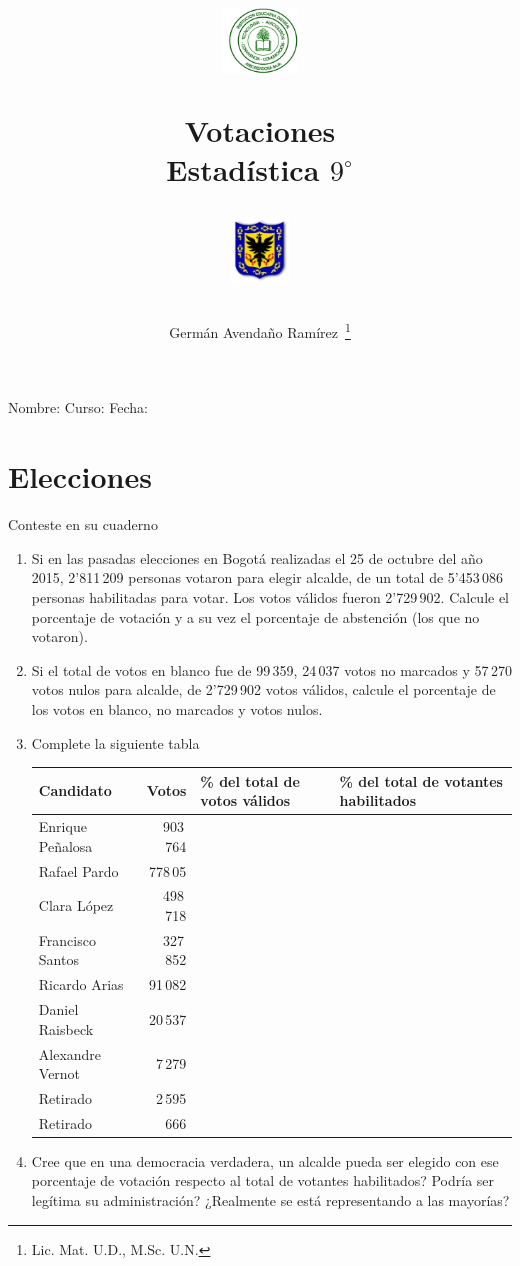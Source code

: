 \documentclass[letterpaper,twoside]{article}
\author{Germ\'an Avenda\~no Ram\'irez~\thanks{Lic. Mat. U.D., M.Sc. U.N.}}
\title{\begin{minipage}{.2\textwidth}
\includegraphics[height=1.75cm]{Images/logo-colegio.png}\end{minipage}
\begin{minipage}{.55\textwidth}
\begin{center}
Votaciones\\
Estadística $9^{\circ}$
\end{center}
\end{minipage}\hfill
\begin{minipage}{.2\textwidth}
\includegraphics[height=1.75cm]{Images/logo-sed.png} 
\end{minipage}}
\date{}
\begin{document}
\maketitle
Nombre: \hrulefill Curso: \underline{\hspace*{44pt}} Fecha: \underline{\hspace*{2.5cm}}
\section*{Elecciones}
Conteste en su cuaderno
\begin{enumerate}
\item Si en las pasadas elecciones en Bogotá realizadas el 25 de octubre del año 2015, 2'811\,209 personas votaron para elegir alcalde, de un total de 5'453\,086 personas habilitadas para votar. Los votos válidos fueron 2'729\,902. Calcule el porcentaje de votación y a su vez el porcentaje de abstención (los que no votaron).
\item Si el total de votos en blanco fue de 99\,359, 24\,037 votos no marcados y 57\,270 votos nulos para alcalde,  de 2'729\,902 votos válidos, calcule el porcentaje de los votos en blanco, no marcados y votos nulos.
\item Complete la siguiente tabla
\begin{center}
\begin{tabular}{|l|r|p{1.9cm}|p{1.9cm}|}
\hline 
Candidato & Votos & \% del total de votos válidos & \% del total de votantes habilitados\\ 
\hline 
Enrique Peñalosa & 903\,764 & &\\ 
\hline 
Rafael Pardo & 778\,05 & &\\ 
\hline 
Clara López & 498\,718 & &\\ 
\hline 
Francisco Santos & 327\,852 & &\\ 
\hline 
Ricardo Arias & 91\,082 & &\\ 
\hline 
Daniel Raisbeck & 20\,537 & &\\ 
\hline 
Alexandre Vernot & 7\,279 & &\\ 
\hline 
Retirado & 2\,595 & &\\ 
\hline 
Retirado & 666 & &\\ 
\hline 
\end{tabular} 
\end{center}
\item Cree que en una democracia verdadera, un alcalde pueda ser elegido con ese porcentaje de votación respecto al total de votantes habilitados? Podría ser legítima su administración? ¿Realmente se está representando a las mayorías?
\end{enumerate}
\end{document}
